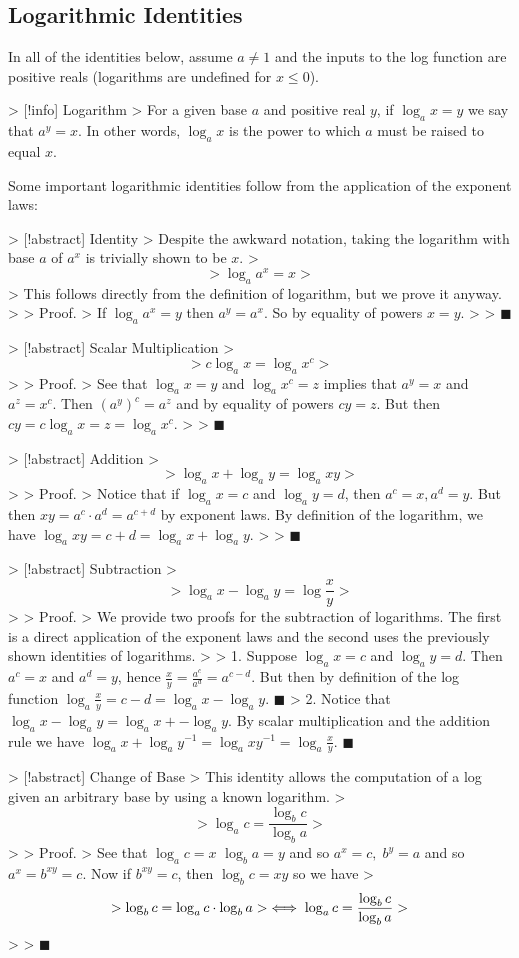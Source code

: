 \documentclass{standalone}
\begin{document}
\subsection{Logarithmic Identities}

In all of the identities below, assume $a \neq 1$ and the inputs to the log function are positive reals (logarithms are undefined for $x \leqslant 0$).

> [!info] Logarithm
> For a given base $a$ and positive real $y$, if $\log_a x = y$ we say that $a^y = x$. In other words, $\log_a x$ is the power to which $a$ must be raised to equal $x$.

Some important logarithmic identities follow from the application of the exponent laws:

> [!abstract] Identity
> Despite the awkward notation, taking the logarithm with base $a$ of $a^x$ is trivially shown to be $x$.
> $$
> \log_a a^x = x
> $$
> This follows directly from the definition of logarithm, but we prove it anyway.
>
> Proof.
> If $\log_a a^x = y$ then $a^y = a^x$. So by equality of powers $x = y$.
>
> $\blacksquare$

> [!abstract] Scalar Multiplication
> $$
> c \log_a x = \log_a x^c
> $$
>
> Proof.
> See that $\log_a x = y$ and $\log_a x^c = z$ implies that $a^y = x$ and $a^z = x^c$. Then $(a^y)^c = a^z$ and by equality of powers $cy = z$. But then $cy = c \log_a x = z = \log_a x^c$.
>
> $\blacksquare$

> [!abstract] Addition
> $$
> \log_a x + \log_a y = \log_a xy
> $$
>
> Proof.
> Notice that if $\log_a x = c$ and $\log_a y = d$, then $a^c = x, a^d = y$. But then $xy = a^c \cdot a^d = a^{c + d}$ by exponent laws. By definition of the logarithm, we have $\log_a xy = c + d = \log_a x + \log_a y$.
>
> $\blacksquare$

> [!abstract] Subtraction
> $$
> \log_a x - \log_a y = \log \frac x y
> $$
>
> Proof.
> We provide two proofs for the subtraction of logarithms. The first is a direct application of the exponent laws and the second uses the previously shown identities of logarithms.
>
> 1. Suppose $\log_a x = c$ and $\log_a y = d$. Then $a^c = x$ and $a^d = y$, hence $\frac x y = \frac {a^c} {a^d} = a^{c - d}$. But then by definition of the log function $\log_a \frac x y = c - d = \log_a x - \log_a y$. $\blacksquare$
> 2. Notice that $\log_a x - \log_a y = \log_a x + -\log_a y$. By scalar multiplication and the addition rule we have $\log_a x + \log_a y^{-1} = \log_a xy^{-1} = \log_a \frac x y$. $\blacksquare$

> [!abstract] Change of Base
> This identity allows the computation of a log given an arbitrary base by using a known logarithm.
> $$
> \log_a c = \frac {\log_b c} {\log_b a}
> $$
>
> Proof.
> See that $\log_a c = x$ $\log_b a = y$ and so $a^x = c, \; b^y = a$ and so $a^x = b^{xy} = c$. Now if $b^{xy} = c$, then $\log_b c = xy$ so we have
> $$
> \log_b c = \log_a c \cdot \log_b a \\
> \iff \log_a c = \frac {\log_b c} {\log_b a}
> $$
>
> $\blacksquare$
\end{document}
